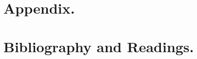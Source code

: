 \documentclass[12pt,leqno]{book}
\begin{document}
\part{Appendix.}



\part{Bibliography and Readings.}




%





%
\end{document}
